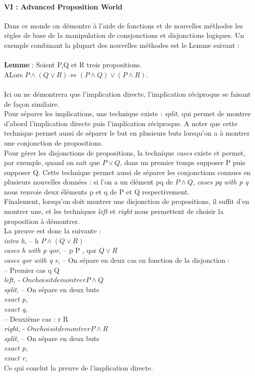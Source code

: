 \documentclass[french,frenchkw]{article}
\begin{document}
\paragraph{VI : Advanced Proposition World}
Dans ce monde on démontre à l'aide de fonctions et de nouvelles méthodes les règles de base de la manipulation de consjonctions et disjonctions logiques. Un exemple combinant la plupart des nouvelles méthodes est le Lemme suivant : \\
\\
\textbf{Lemme} : Soient P,Q et R trois propositions. \\
ALors $P\land(Q\lor R) \Longleftrightarrow (P\land Q)\lor(P\land R)$.\\
\\
Ici on ne démontrera que l'implication directe, l'implication réciproque se faisant de façon similaire.\\
Pour séparer les implications, une technique existe : \textit{split}, qui permet de montrer d'abord l'implication directe puis l'implication réciproque. A noter que cette technique permet aussi de séparer le but en plusieurs buts lorsqu'on a à montrer une conjonction de propositions.\\
Pour gérer les disjonctions de propositions, la technique \textit{cases} existe et permet, par exemple, quand on sait que $P\lor Q$, dans un premier temps supposer P puis supposer Q. Cette technique permet aussi de séparer les conjonctions connues en plusieurs nouvelles données : si l'on a un élément pq de $P\land Q$, \textit{cases pq with p q} nous renvoie deux éléments p et q de P et Q respectivement.\\
Finalement, lorsqu'on doit montrer une disjonction de propositions, il suffit d'en montrer une, et les techniques \textit{left} et \textit{right} nous permettent de choisir la proposition à démontrer.\\
La preuve est donc la suivante : \\
\textit{intro h,}     -- h \in $P\land (Q\lor R)$\\ 
\textit{cases h with p qor,}     -- p \in P , qor \in $Q\lor R$\\
\textit{cases qor with q r,}     -- On sépare en deux cas en fonction de la disjonction :\\ 

-- Premier cas q \in Q\\
\textit{left,}   - $On choisit de montrer P\land Q$\\
\textit{split,}     -- On sépare en deux buts\\
\textit{exact p,}\\
\textit{exact q,}\\

-- Deuxième cas : r \in R\\
\textit{right,}     - $On choisit de montrer P\land R$\\
\textit{split,}     -- On sépare en deux buts\\
\textit{exact p,}\\
\textit{exact r,}\\
Ce qui conclut la preuve de l'implication directe.


\end{document}
